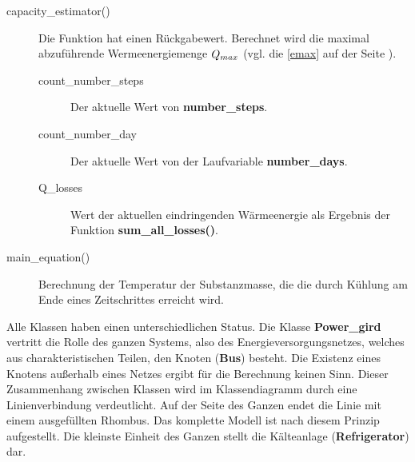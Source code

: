 \begin{description}
	\item[capacity\_estimator()] Die Funktion hat einen R\"uckgabewert.
	Berechnet wird die maximal abzuf\"uhrende Wermeenergiemenge $Q_{max}$
	(vgl. die \cref{emax} auf der Seite \pageref{emax}).
	\begin{description}
		\item[count\_number\_steps] Der aktuelle Wert von
		\textbf{number\_steps}.
		\item[count\_number\_day] Der aktuelle Wert von der Laufvariable
		\textbf{number\_days}.
		\item[Q\_losses] Wert der aktuellen eindringenden
		W\"armeenergie als Ergebnis der Funktion
		\textbf{sum\_all\_losses()}.
		\end{description}
	\item[main\_equation()] Berechnung der Temperatur der Substanzmasse, die
	die durch K\"uhlung am Ende eines Zeitschrittes erreicht wird.
\end{description}

Alle Klassen haben einen unterschiedlichen Status. Die Klasse
\textbf{Power\_gird} vertritt die Rolle des ganzen Systems, also des
Energieversorgungsnetzes, welches aus charakteristischen Teilen, den Knoten
(\textbf{Bus}) besteht. Die Existenz eines Knotens au\ss erhalb eines Netzes
ergibt f\"ur die Berechnung keinen Sinn. Dieser Zusammenhang zwischen Klassen
wird im Klassendiagramm durch eine Linienverbindung verdeutlicht. Auf der Seite
des Ganzen endet die Linie mit einem ausgef\"ullten Rhombus. Das komplette
Modell ist nach diesem Prinzip aufgestellt. Die kleinste Einheit des Ganzen
stellt die K\"alteanlage (\textbf{Refrigerator}) dar.

